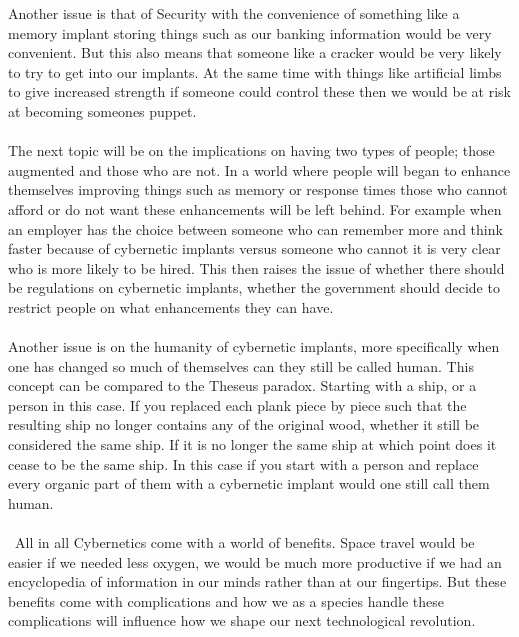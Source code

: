 \documentclass[12pt,a4paper,notitlepage]{article}
\begin{document}
    Another issue is that of Security with the convenience of something like a
memory implant storing things such as our banking information would be very
convenient. But this also means that someone like a cracker would be very likely
to try to get into our implants. At the same time with things like artificial
limbs to give increased strength if someone could control these then we would be
at risk at becoming someones puppet.
\\\\
    The next topic will be on the implications on having two types of people;
those augmented and those who are not. In a world where people will began to
enhance themselves improving things such as memory or response times those who
cannot afford or do not want these enhancements will be left behind. For
example when an employer has the choice between someone who can remember more 
and think faster because of cybernetic implants versus someone who cannot it is
very clear who is more likely to be hired. This then raises the issue of whether
there should be regulations on cybernetic implants, whether the government
should decide to restrict people on what enhancements they can have. 
\\\\
    Another issue is on the humanity of cybernetic implants, more specifically
when one has changed so much of themselves can they still be called human. This
concept can be compared to the Theseus paradox. Starting with a ship, or a
person in this case. If you replaced each plank piece by piece such that the
resulting ship no longer contains any of the original wood, whether it still be
considered the same ship. If it is no longer the same ship at which point does
it cease to be the same ship. In this case if you start with a person and
replace every organic part of them with a cybernetic implant would one still
call them human.
\\\\\
    All in all Cybernetics come with a world of benefits. Space travel would be
easier if we needed less oxygen, we would be much more productive if we had an
encyclopedia of information in our minds rather than at our fingertips. But
these benefits come with complications and how we as a species handle these
complications will influence how we shape our next technological revolution.
\newpage
\end{document}
